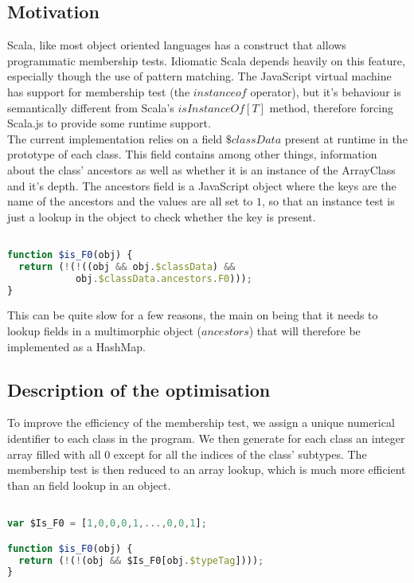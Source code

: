 \subsection{Motivation}
Scala, like most object oriented languages has a construct that allows
programmatic membership tests. Idiomatic Scala depends heavily on this feature,
especially though the use of pattern matching.
The JavaScript virtual machine has support for membership test (the
$instanceof$ operator), but it's behaviour is semantically different from
Scala's $isInstanceOf[T]$ method, therefore forcing Scala.js to provide some
runtime support. \\
The current implementation relies on a field $\$classData$ present at
runtime in the prototype of each class. This field contains among other things,
information about the class' ancestors as well as whether it is an instance of
the ArrayClass and it's depth. The ancestors field is a JavaScript object where
the keys are the name of the ancestors and the values are all set to $1$, so
that an instance test is just a lookup in the object to check whether the key
is present. 

\begin{lstlisting}[language=javascript,caption=Old membership test,
label={lst:oldIsInstanceOf}]

function $is_F0(obj) {
  return (!(!((obj && obj.$classData) && 
            obj.$classData.ancestors.F0)));
}

\end{lstlisting}
This can be quite slow for a few reasons, the main on being that it needs to
lookup fields in a multimorphic object ($ancestors$) that will therefore
be implemented as a HashMap.\\

\subsection{Description of the optimisation}
To improve the efficiency of the membership test, we assign a unique numerical
identifier to each class in the program. We then generate for each class an
integer array filled with all 0 except for all the indices of the class'
subtypes. The membership test is then reduced to an array lookup, which is much
more efficient than an field lookup in an object. 

\begin{lstlisting}[language=javascript,caption=New membership test,
label={lst:newIsInstanceOf}]

var $Is_F0 = [1,0,0,0,1,...,0,0,1];

function $is_F0(obj) {
  return (!(!(obj && $Is_F0[obj.$typeTag])));
}

\end{lstlisting}

